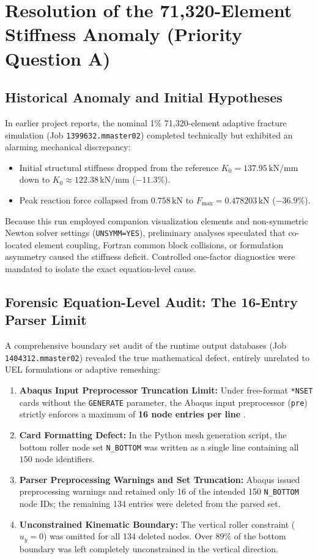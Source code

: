 \section{Resolution of the 71,320-Element Stiffness Anomaly (Priority Question A)}
\label{sec:stiffness_anomaly_resolution}

\subsection{Historical Anomaly and Initial Hypotheses}
In earlier project reports, the nominal 1\% 71,320-element adaptive fracture simulation (Job \texttt{1399632.mmaster02}) completed technically but exhibited an alarming mechanical discrepancy:
\begin{itemize}[leftmargin=4mm,itemsep=1pt,topsep=1pt]
  \item Initial structural stiffness dropped from the reference $K_0 = 137.95\,\mathrm{kN/mm}$ down to $K_0 \approx 122.38\,\mathrm{kN/mm}$ ($-11.3\%$).
  \item Peak reaction force collapsed from $0.758\,\mathrm{kN}$ to $F_{\max} = 0.478203\,\mathrm{kN}$ ($-36.9\%$).
\end{itemize}
Because this run employed companion visualization elements and non-symmetric Newton solver settings (\texttt{UNSYMM=YES}), preliminary analyses speculated that co-located element coupling, Fortran common block collisions, or formulation asymmetry caused the stiffness deficit. Controlled one-factor diagnostics were mandated to isolate the exact equation-level cause.

\subsection{Forensic Equation-Level Audit: The 16-Entry Parser Limit}
A comprehensive boundary set audit of the runtime output databases (Job \texttt{1404312.mmaster02}) revealed the true mathematical defect, entirely unrelated to UEL formulations or adaptive remeshing:
\begin{enumerate}[leftmargin=4mm,itemsep=1pt,topsep=1pt]
  \item \textbf{Abaqus Input Preprocessor Truncation Limit:} Under free-format \texttt{*NSET} cards without the \texttt{GENERATE} parameter, the Abaqus input preprocessor (\texttt{pre}) strictly enforces a maximum of \textbf{16 node entries per line} \citep{Abaqus2023}.
  \item \textbf{Card Formatting Defect:} In the Python mesh generation script, the bottom roller node set \texttt{N\_BOTTOM} was written as a single line containing all $150$ node identifiers.
  \item \textbf{Parser Preprocessing Warnings and Set Truncation:} Abaqus issued preprocessing warnings and retained only 16 of the intended 150 \texttt{N\_BOTTOM} node IDs; the remaining 134 entries were deleted from the parsed set.
  \item \textbf{Unconstrained Kinematic Boundary:} The vertical roller constraint ($u_y = 0$) was omitted for all 134 deleted nodes. Over $89\%$ of the bottom boundary was left completely unconstrained in the vertical direction.
\end{enumerate}

